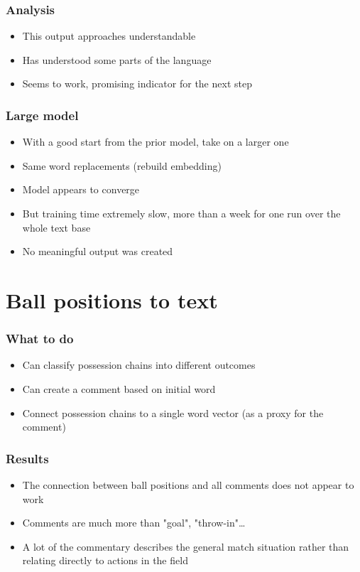 \documentclass{beamer}
\begin{document}
\begin{frame}
\frametitle{Analysis}
\begin{itemize}
\item This output approaches understandable
\item Has understood some parts of the language
\item Seems to work, promising indicator for the next step
\end{itemize}
\end{frame}

\begin{frame}
\frametitle{Large model}
\begin{itemize}
\item With a good start from the prior model, take on a larger one
\item Same word replacements (rebuild embedding)
\item Model appears to converge
\item But training time extremely slow, more than a week for one run over the whole text base
\item No meaningful output was created
\end{itemize}
\end{frame}

\section{Ball positions to text}

\begin{frame}
\frametitle{What to do}
\begin{itemize}
\item Can classify possession chains into different outcomes
\item Can create a comment based on initial word
\item Connect possession chains to a single word vector (as a proxy for the comment)
\end{itemize}
\end{frame}

\begin{frame}
\frametitle{Results}
\begin{itemize}
\item The connection between ball positions and all comments does not appear to work
\item Comments are much more than "goal", "throw-in"…
\item A lot of the commentary describes the general match situation rather than relating directly to actions in the field
\end{itemize}
\end{frame}
\end{document}
